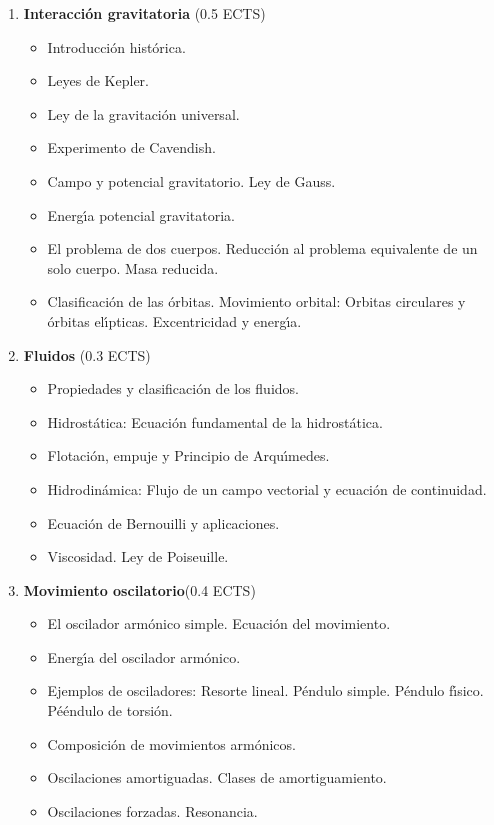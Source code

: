 \begin{enumerate}[{\bf 1. }]
\item {\bf  Interacci\'{o}n gravitatoria} \hfill (0.5 ECTS)
\begin{itemize} \addtolength{\itemsep}{-0.25\baselineskip}
\noindent
\item Introducci\'{o}n hist\'{o}rica.
\item Leyes de Kepler.
\item Ley de la gravitaci\'{o}n universal.
\item Experimento  de Cavendish.
\item Campo y potencial gravitatorio. Ley de Gauss.
\item Energ\'{\i}a potencial gravitatoria.
\item El problema de dos cuerpos. Reducci\'{o}n al problema equivalente de 
un solo cuerpo. Masa reducida.
\item Clasificaci\'{o}n de las \'{o}rbitas. Movimiento orbital: {O}rbitas circulares y \'{o}rbitas el\'{\i}pticas. Excentricidad y energ\'{\i}a.
\end{itemize}
%


\item {\bf  Fluidos}  \hfill (0.3 ECTS)
\begin{itemize} \addtolength{\itemsep}{-0.25\baselineskip}
\noindent
\item Propiedades y clasificaci\'{o}n de los fluidos.
\item Hidrost\'{a}tica: Ecuaci\'{o}n fundamental de la hidrost\'{a}tica.
\item Flotaci\'{o}n, empuje y  Principio de Arqu\'{\i}medes.
\item Hidrodin\'{a}mica: Flujo de un campo vectorial y ecuaci\'{o}n de continuidad. 
\item Ecuaci\'{o}n de Bernouilli y aplicaciones.
\item Viscosidad. Ley de Poiseuille.
\end{itemize}
%


\item {\bf  Movimiento oscilatorio}\hfill   (0.4 ECTS)
\begin{itemize} \addtolength{\itemsep}{-0.25\baselineskip}
\noindent
\item  El oscilador arm\'{o}nico simple. Ecuaci\'{o}n del movimiento.
\item Energ\'{\i}a del oscilador arm\'{o}nico.
\item Ejemplos de osciladores: Resorte lineal. P\'{e}ndulo simple.
 P\'{e}ndulo f\'{\i}sico.  P\'{e}éndulo de torsi\'{o}n.
\item Composici\'{o}n de movimientos arm\'{o}nicos.
\item Oscilaciones amortiguadas. Clases de amortiguamiento.
\item Oscilaciones forzadas.  Resonancia.
\end{itemize}
%


\end{enumerate}
